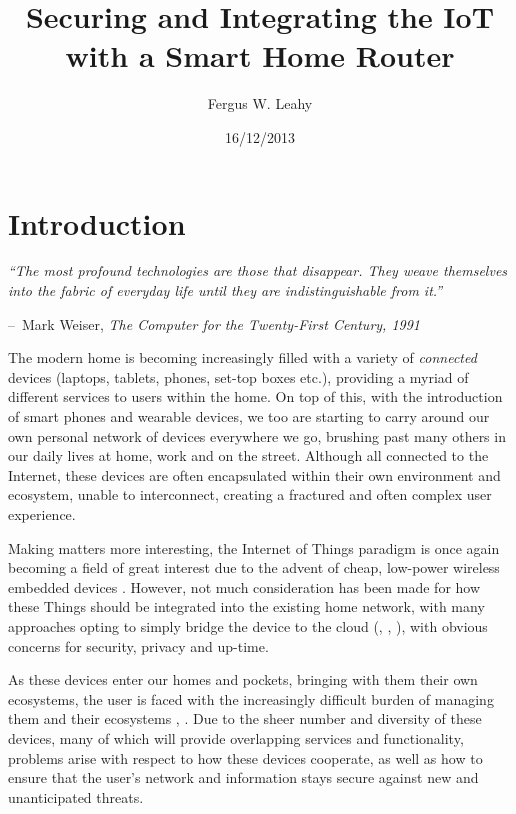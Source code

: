 \documentclass{mprop}
\makeatletter
\newenvironment{chapquote}[2][2em]
  {\setlength{\@tempdima}{#1}%
   \def\chapquote@author{#2}%
   \parshape 1 \@tempdima \dimexpr\textwidth-2\@tempdima\relax%
   \itshape}
  {\par\normalfont\hfill--\ \chapquote@author\hspace*{\@tempdima}\par\bigskip}
\makeatother
\begin{document}
\title{Securing and Integrating the IoT with a Smart Home Router}
\author{Fergus W. Leahy}
\date{16/12/2013}
\maketitle

\tableofcontents
\newpage

\section{Introduction}
\label{sec:introduction}

\begin{chapquote}{Mark Weiser, \textit{The Computer for the Twenty-First Century, 1991}}
    ``The most profound technologies are those that disappear. They weave themselves into the fabric of everyday life until they are indistinguishable from it.''
\end{chapquote}

The modern home is becoming increasingly filled with a variety of \textit{connected} devices (laptops, tablets, phones, set-top boxes etc.), providing a myriad of different services to users within the home. On top of this, with the introduction of smart phones and wearable devices, we too are starting to carry around our own personal network of devices everywhere we go, brushing past many others in our daily lives at home, work and on the street. Although all connected to the Internet, these devices are often encapsulated within their own environment and ecosystem, unable to interconnect, creating a fractured and often complex user experience. 

Making matters more interesting, the Internet of Things paradigm is once again becoming a field of great interest due to the advent of cheap, low-power wireless embedded devices \cite{2013IoT}. However, not much consideration has been made for how these Things should be integrated into the existing home network, with many approaches opting to simply bridge the device to the cloud (\cite{SmartThings}, \cite{Twine}, \cite{IETF_CORE}), with obvious concerns for security, privacy and up-time.

As these devices enter our homes and pockets, bringing with them their own ecosystems, the user is faced with the increasingly difficult burden of managing them and their ecosystems \cite{brundell2011w}, \cite{brown2013multinet}. Due to the sheer number and diversity of these devices, many of which will provide overlapping services and functionality, problems arise with respect to how these devices cooperate, as well as how to ensure that the user's network and information stays secure against new and unanticipated threats.
\end{document}
